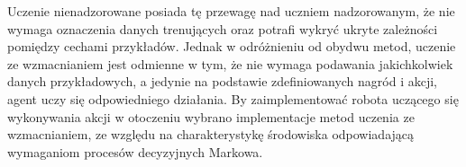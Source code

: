 Uczenie nienadzorowane posiada tę przewagę nad uczniem nadzorowanym, że nie wymaga oznaczenia danych trenujących 
oraz potrafi wykryć ukryte zależności pomiędzy cechami przykładów. Jednak w odróżnieniu od obydwu metod, uczenie ze 
wzmacnianiem jest odmienne w tym, że nie wymaga podawania jakichkolwiek danych przykładowych, a jedynie na podstawie 
zdefiniowanych nagród i akcji, agent uczy się odpowiedniego działania.
By zaimplementować robota uczącego się wykonywania akcji w otoczeniu wybrano implementacje metod uczenia ze 
wzmacnianiem, ze względu na charakterystykę środowiska odpowiadającą wymaganiom procesów decyzyjnych Markowa.












